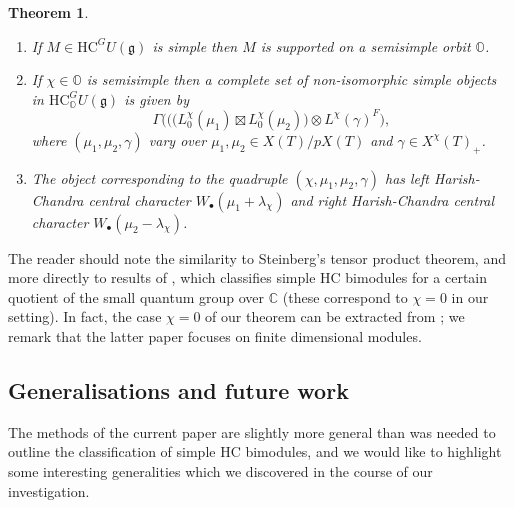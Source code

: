 \documentclass[twoside,12pt,reqno]{amsart}
\newtheorem{Theorem}{Theorem}[section]
\theoremstyle{remark}
\numberwithin{equation}{section}
\def\C{{\mathbb C}}
\def\O{{\mathbb O}}
\def\HC{\mathrm{HC}}
\def\g{{\mathfrak g}}
\begin{document}
\begin{Theorem}\label{T:MainThm}
    \begin{enumerate}
    \setlength{\itemsep}{6pt}
        \item If $M \in \HC^G U(\g)$ is simple then $M$ is supported on a semisimple orbit $\O$.
        \item If $\chi \in \O$ is semisimple then a complete set of non-isomorphic simple objects in $\HC_\O^G U(\g)$ is given by
        $$\Gamma \Big(\big((L_0^\chi(\mu_1) \boxtimes L_0^\chi(\mu_2)\big) \otimes L^\chi(\gamma)^F\Big),$$
        where $(\mu_1, \mu_2, \gamma)$ vary over $\mu_1, \mu_2 \in X(T)/pX(T)$ and $\gamma \in X^\chi(T)_+$.
        \item The object corresponding to the quadruple $(\chi,\mu_1,\mu_2,\gamma)$ has left Harish-Chandra central character $W_\bullet(\mu_1 + \lambda_\chi)$ and right Harish-Chandra central character $W_\bullet (\mu_2 - \lambda_\chi)$.
    \end{enumerate}
    

    
\end{Theorem}

The reader should note the similarity to Steinberg's tensor product theorem, and more directly to results of \cite[]{Vu}, which classifies simple HC bimodules for a certain quotient of the small quantum group over $\C$ (these correspond to $\chi = 0$ in our setting). In fact, the case $\chi = 0$ of our theorem can be extracted from \cite[Theorem~5.5]{Ho}; we remark that the latter paper focuses on finite dimensional modules.


\subsection{Generalisations and future work}

The methods of the current paper are slightly more general than was needed to outline the classification of simple HC bimodules, and we would like to highlight some interesting generalities which we discovered in the course of our investigation.
\end{document}
